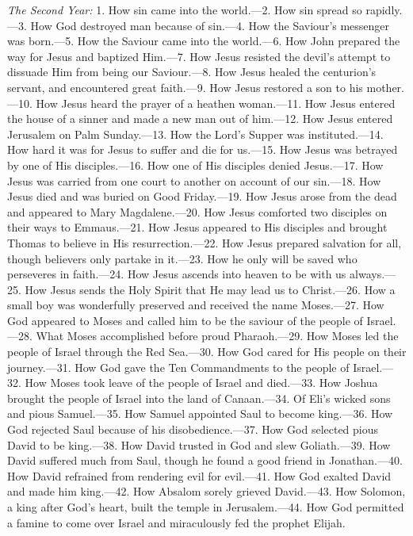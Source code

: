 \emph{The Second Year:} 1. How sin came into the world.—2. How sin spread so rapidly.—3. How God destroyed man because of sin.—4. How the Saviour’s messenger was born.—5. How the Saviour came into the world.—6. How John prepared the way for Jesus and baptized Him.—7. How Jesus resisted the devil’s attempt
to dissuade Him from being our Saviour.—8. How Jesus healed the centurion’s servant, and encountered great faith.—9. How Jesus restored a son to his mother.—10. How Jesus heard the prayer of a heathen woman.—11. How Jesus entered the house of a sinner and made a new man out of him.—12. How Jesus entered Jerusalem on Palm Sunday.—13. How the Lord’s Supper was instituted.—14. How hard it was for Jesus to suffer and die for us.—15. How Jesus was betrayed by one of His disciples.—16. How one of His disciples denied Jesus.—17. How Jesus was carried from one court to another on account of our sin.—18. How Jesus died and was buried on Good Friday.—19. How Jesus arose from the dead and appeared to Mary Magdalene.—20. How Jesus comforted two disciples on their ways to Emmaus.—21. How Jesus appeared to His disciples and brought Thomas to believe in His resurrection.—22. How Jesus prepared salvation for all, though believers only partake in it.—23. How he only will be saved who perseveres in faith.—24. How Jesus ascends into heaven to be with us always.—25. How Jesus sends the Holy Spirit that He may lead us to Christ.—26. How a small boy was wonderfully preserved and received the name Moses.—27. How God appeared to Moses and called him to be the saviour of the people of Israel.—28. What Moses accomplished before proud Pharaoh.—29. How Moses led the people of Israel through the Red Sea.—30. How God cared for His people on their journey.—31. How God gave the Ten Commandments to the people of Israel.—32. How Moses took leave of the people of Israel and died.—33. How Joshua brought the people of Israel into the land of Canaan.—34. Of Eli’s wicked sons and pious Samuel.—35. How Samuel appointed Saul to become king.—36. How God rejected Saul because of his disobedience.—37. How God selected pious David to be king.—38. How David trusted in God and slew Goliath.—39. How David suffered much from Saul, though he found a good friend in Jonathan.—40. How David refrained from rendering evil for evil.—41. How God exalted David and made him king.—42. How Absalom sorely grieved David.—43. How Solomon, a king after God’s heart, built the temple in Jerusalem.—44. How God permitted a famine to come over Israel and miraculously fed the prophet Elijah.

